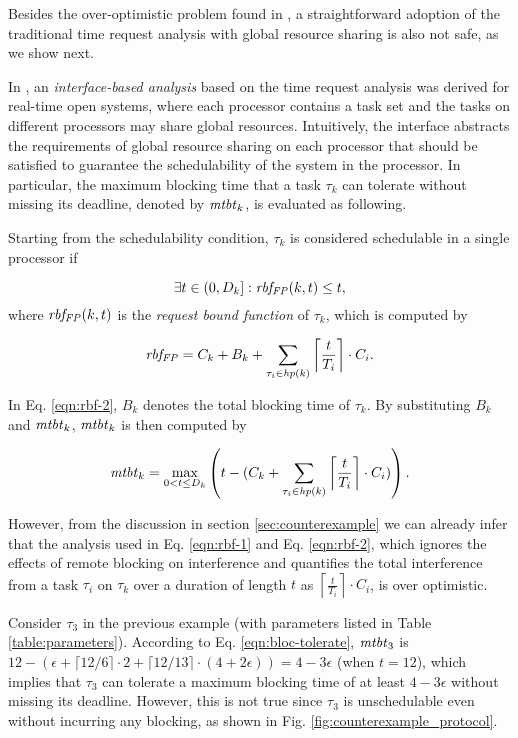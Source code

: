 Besides the over-optimistic problem found in \cite{lakshmanan-2009}, a straightforward adoption of the traditional time request analysis with global resource sharing is also not safe, as we show next.

 In \cite{NBN:11}, an \emph{interface-based analysis} based on the time request analysis was derived for real-time open systems, where each processor contains a task set and the tasks on different processors may share global resources. Intuitively, the interface abstracts the requirements of global resource sharing on each processor that should be satisfied to guarantee the schedulability of the system in the processor. In particular, the maximum blocking time that a task $\tau_k$ can tolerate without missing its deadline, denoted by $\mathit{mtbt}_k$, is evaluated as following. 

Starting from the schedulability condition, $\tau_k$ is considered schedulable in a single processor if

\begin{equation}
\label{eqn:rbf-1}
\exists t \in (0,D_k]: \mathit{rbf_{FP}}(k,t) \leq t, 
\end{equation}
where $\mathit{rbf_{FP}}(k,t)$ is the \emph{request bound function} of $\tau_k$, which is computed by

\begin{equation}
\label{eqn:rbf-2}
\mathit{rbf_{FP}} = C_k + B_k + \sum_{\tau_i \in \mathit{hp}(k)} \left \lceil \frac{t}{T_i} \right \rceil \cdot C_i.
\end{equation}

In Eq. \ref{eqn:rbf-2}, $B_k$ denotes the total blocking time of $\tau_k$. By substituting $B_k$ and $\mathit{mtbt}_k$, $\mathit{mtbt}_k$ is then computed by

\begin{equation}
\label{eqn:bloc-tolerate}
\mathit{mtbt}_k = \max_{0<t \leq D_k} \left( t - ( C_k + \sum_{\tau_i \in \mathit{hp}(k)} \left \lceil \frac{t}{T_i} \right \rceil \cdot C_i ) \right).
\end{equation}

However, from the discussion in section \ref{sec:counterexample} we can already infer that the analysis used in Eq. \ref{eqn:rbf-1} and Eq. \ref{eqn:rbf-2}, which ignores the effects of remote blocking on interference and quantifies the total interference from a task $\tau_i$ on $\tau_k$ over a duration of length $t$ as $\left \lceil \frac{t}{T_i} \right \rceil \cdot C_i$, is over optimistic. 

Consider $\tau_3$ in the previous example (with parameters listed in Table \ref{table:parameters}). According to Eq. \ref{eqn:bloc-tolerate}, $\mathit{mtbt}_3$ is $12 - (\epsilon + \lceil 12 / 6 \rceil \cdot 2 + \lceil 12 / 13 \rceil \cdot (4+2\epsilon)) = 4-3\epsilon$ (when $t=12$), which implies that $\tau_3$ can tolerate a maximum blocking time of at least $4-3\epsilon$ without missing its deadline. However, this is not true since $\tau_3$ is unschedulable even without incurring any blocking, as shown in Fig. \ref{fig:counterexample_protocol}.

